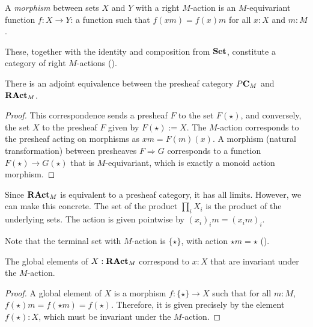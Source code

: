 \begin{definition}
  A \textit{morphism} between sets $ X $ and $ Y $ with a right $ M $-action is an $ M $-equivariant function $ f: X \to Y $: a function such that $ f(xm) = f(x)m $ for all $ x: X $ and $ m: M $.
\end{definition}

These, together with the identity and composition from $ \mathbf{Set} $, constitute a category  of right $ M $-actions ().

\begin{lemma}
  There is an adjoint equivalence between the presheaf category $ P \mathbf{C}_M $ and $ \mathbf{RAct}_{M} $.
\end{lemma}
\begin{proof}
  This correspondence sends a presheaf $ F $ to the set $ F(\star) $, and conversely, the set $ X $ to the presheaf $ F $ given by $ F(\star) := X $. The $ M $-action corresponds to the presheaf acting on morphisms as $ xm = F(m)(x) $. A morphism (natural transformation) between presheaves $ F \Rightarrow G $ corresponds to a function $ F(\star) \to G(\star) $ that is $ M $-equivariant, which is exactly a monoid action morphism.
\end{proof}

\begin{remark}
  Since $ \mathbf{RAct}_{M} $ is equivalent to a presheaf category, it has all limits. However, we can make this concrete. The set of the product $ \prod_i X_i $ is the product of the underlying sets. The action is given pointwise by $ (x_i)_i m = (x_i m)_i $.
\end{remark}

Note that the terminal set with $ M $-action is $ \{ \star \} $, with action $ \star m = \star $ ().

\begin{lemma}\label{lem:global-action-elements}
  The global elements of $ X : \mathbf{RAct}_{M} $ correspond to $ x : X $ that are invariant under the $ M $-action.
\end{lemma}
\begin{proof}
  A global element of $ X $ is a morphism $ f: \{ \star \} \to X $ such that for all $ m: M $, $ f(\star)m = f(\star m) = f(\star) $. Therefore, it is given precisely by the element $ f(\star): X $, which must be invariant under the $ M $-action.
\end{proof}


